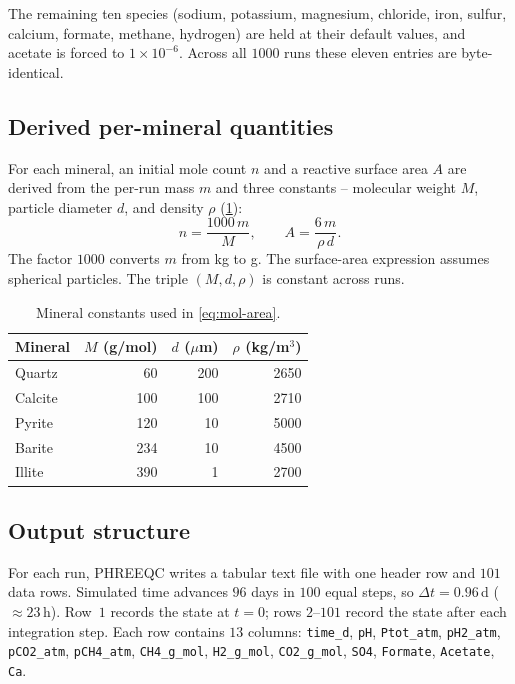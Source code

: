 The remaining ten species (sodium, potassium, magnesium, chloride,
iron, sulfur, calcium, formate, methane, hydrogen) are held at their
default values, and acetate is forced to $1\times10^{-6}$. Across all
$1000$ runs these eleven entries are byte-identical.

\subsection{Derived per-mineral quantities}\label{sec:data:derived}

For each mineral, an initial mole count $n$ and a reactive surface
area $A$ are derived from the per-run mass $m$ and three constants --
molecular weight $M$, particle diameter $d$, and density $\rho$
(\cref{tab:data:minprops}):
\begin{equation}\label{eq:mol-area}
  n = \frac{1000\,m}{M}, \qquad A = \frac{6\,m}{\rho\,d}.
\end{equation}
The factor $1000$ converts $m$ from kg to g. The surface-area
expression assumes spherical particles. The triple $(M, d, \rho)$ is
constant across runs.

\begin{table}[ht]
  \centering
  \caption{Mineral constants used in \cref{eq:mol-area}.}
  \label{tab:data:minprops}
  \begin{tabular}{lrrr}
    \toprule
    Mineral & $M$ (g/mol) & $d$ ($\mu$m) & $\rho$ (kg/m$^3$) \\
    \midrule
    Quartz  &  60 & 200 & 2650 \\
    Calcite & 100 & 100 & 2710 \\
    Pyrite  & 120 &  10 & 5000 \\
    Barite  & 234 &  10 & 4500 \\
    Illite  & 390 &   1 & 2700 \\
    \bottomrule
  \end{tabular}
\end{table}

\subsection{Output structure}\label{sec:data:out}

For each run, PHREEQC writes a tabular text file with one header row
and $101$ data rows. Simulated time advances $96$ days in $100$ equal
steps, so $\Delta t = 0.96$\,d ($\approx 23$\,h). Row~$1$ records the
state at $t = 0$; rows $2$--$101$ record the state after each
integration step. Each row contains $13$ columns:
\texttt{time\_d}, \texttt{pH}, \texttt{Ptot\_atm}, \texttt{pH2\_atm},
\texttt{pCO2\_atm}, \texttt{pCH4\_atm}, \texttt{CH4\_g\_mol},
\texttt{H2\_g\_mol}, \texttt{CO2\_g\_mol}, \texttt{SO4},
\texttt{Formate}, \texttt{Acetate}, \texttt{Ca}.

